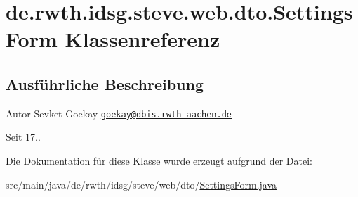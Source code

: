 \hypertarget{classde_1_1rwth_1_1idsg_1_1steve_1_1web_1_1dto_1_1_settings_form}{\section{de.\+rwth.\+idsg.\+steve.\+web.\+dto.\+Settings\+Form Klassenreferenz}
\label{classde_1_1rwth_1_1idsg_1_1steve_1_1web_1_1dto_1_1_settings_form}
}


\subsection{Ausführliche Beschreibung}
\begin{DoxyAuthor}{Autor}
Sevket Goekay \href{mailto:goekay@dbis.rwth-aachen.de}{\tt goekay@dbis.\+rwth-\/aachen.\+de} 
\end{DoxyAuthor}
\begin{DoxySince}{Seit}
17.. 
\end{DoxySince}


Die Dokumentation für diese Klasse wurde erzeugt aufgrund der Datei\+:\begin{DoxyCompactItemize}
\item 
src/main/java/de/rwth/idsg/steve/web/dto/\hyperlink{_settings_form_8java}{Settings\+Form.\+java}\end{DoxyCompactItemize}
